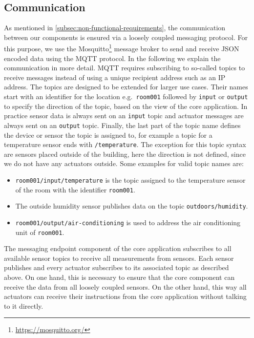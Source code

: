 \subsection{Communication}\label{subsec:communication}

As mentioned in \cref{subsec:non-functional-requirements}, the communication between our components is ensured via a loosely coupled messaging protocol.
For this purpose, we use the Mosquitto\footnote{\url{https://mosquitto.org/}} message broker to send and receive JSON encoded data using the MQTT protocol.
In the following we explain the communication in more
detail.
MQTT requires subscribing to so-called topics to receive messages instead of using a unique recipient address such as an IP address.
The topics are designed to be extended for larger use cases.
Their names start with an identifier for the location e.g.~\texttt{room001} followed by \texttt{input} or \texttt{output} to specify the direction of the topic, based on the view of the core application.
In practice sensor data is always sent on an \texttt{input} topic and actuator messages are always sent on an \texttt{output} topic.
Finally, the last part of the topic name defines the
device or sensor the topic is assigned to, for example a topic for a temperature sensor ends with \texttt{/temperature}.
The exception for this topic syntax are sensors placed outside of the building, here the direction is not defined, since we do not have any actuators outside.
Some examples for valid topic names are:
\begin{itemize}
    \item \texttt{room001/input/temperature} is the topic assigned to the temperature sensor of the room with the identifier \texttt{room001}.
    \item The outside humidity sensor publishes data on the topic \texttt{outdoors/humidity}.
    \item \texttt{room001/output/air-conditioning} is used to address the air conditioning unit of \texttt{room001}.
\end{itemize}

The messaging endpoint component of the core application subscribes to all available sensor topics to receive all measurements from sensors.
Each sensor publishes and every actuator subscribes to its associated topic as described above.
On one hand, this is necessary to ensure that the core component can receive the data from all loosely coupled sensors.
On the other hand, this way all actuators can receive their instructions from the core application without talking to it directly.

